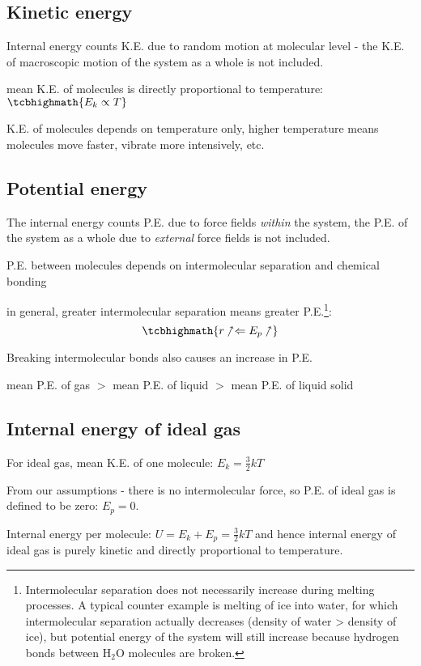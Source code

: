 \subsection{Kinetic energy}

Internal energy counts K.E. due to random motion at molecular level - the K.E. of macroscopic motion of the system as a whole is not included.

\cmt mean K.E. of molecules is directly proportional to temperature: $\tcbhighmath{E_k \propto T}$

K.E. of molecules depends on temperature only, higher temperature means molecules move faster, vibrate more intensively, etc.





\subsection{Potential energy}

The internal energy counts P.E. due to force fields \emph{within} the system, the P.E. of the system as a whole due to \emph{external} force fields is not included.

\cmt P.E. between molecules depends on intermolecular separation and chemical bonding

in general, greater intermolecular separation means greater P.E.\footnote{Intermolecular separation does not necessarily increase during melting processes. A typical counter example is melting of ice into water, for which intermolecular separation actually decreases (density of water > density of ice), but potential energy of the system will still increase because hydrogen bonds between H$_2$O molecules are broken.}: $$\tcbhighmath{r \up \Leftarrow E_p \up}$$

Breaking intermolecular bonds also causes an increase in P.E.

mean P.E. of gas $>$ mean P.E. of liquid $>$ mean P.E. of liquid solid

\subsection{Internal energy of ideal gas}

For ideal gas, mean K.E. of one molecule: $E_k = \frac{3}{2}kT$

From our assumptions - there is no intermolecular force, so P.E. of ideal gas is defined to be zero: $E_p = 0$.

Internal energy per molecule: $U = E_k + E_p = \frac{3}{2}kT$ and hence internal energy of ideal gas is purely kinetic and directly proportional to temperature. 

